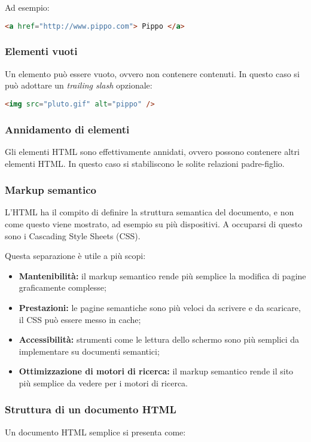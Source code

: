 \documentclass[a4paper,11pt]{article}
\begin{document}
Ad esempio: 
\begin{lstlisting}[language=html, style=codestyle]	
<a href="http://www.pippo.com"> Pippo </a>
\end{lstlisting}

\subsubsection{Elementi vuoti}
Un elemento può essere vuoto, ovvero non contenere contenuti.
In questo caso si può adottare un \textit{trailing slash} opzionale:
\begin{lstlisting}[language=html, style=codestyle]	
<img src="pluto.gif" alt="pippo" />
\end{lstlisting}

\subsubsection{Annidamento di elementi}
Gli elementi HTML sono effettivamente annidati, ovvero possono contenere altri elementi HTML.
In questo caso si stabiliscono le solite relazioni padre-figlio.

\subsubsection{Markup semantico}
L'HTML ha il compito di definire la struttura semantica del documento, e non come questo viene mostrato, ad esempio su più dispositivi. 
A occuparsi di questo sono i Cascading Style Sheets (CSS).

Questa separazione è utile a più scopi:
\begin{itemize}
	\item \textbf{Mantenibilità:} il markup semantico rende più semplice la modifica di pagine graficamente complesse;
	\item \textbf{Prestazioni:} le pagine semantiche sono più veloci da scrivere e da scaricare, il CSS può essere messo in cache;
	\item \textbf{Accessibilità:} strumenti come le lettura dello schermo sono più semplici da implementare su documenti semantici;
	\item \textbf{Ottimizzazione di motori di ricerca:} il markup semantico rende il sito più semplice da vedere per i motori di ricerca.
\end{itemize}

\subsubsection{Struttura di un documento HTML}
Un documento HTML semplice si presenta come:
\end{document}
